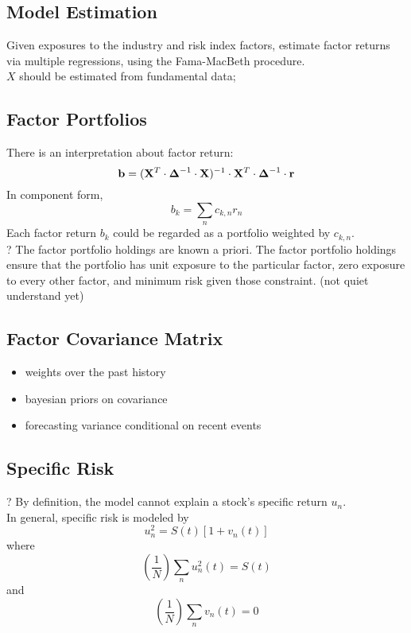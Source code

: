 \documentclass[fontsize=11pt, %
                             paper=a4, %
                             twoside, %
                             captions=tableheading,
                             index=totoc,
                             hyperref]{labbook}
\begin{document}
\begin{addmargin}[4cm]{0cm}
\section{Model Estimation}
Given exposures to the industry and risk index factors, estimate factor returns via multiple regressions, using the Fama-MacBeth procedure.\\
$X$ should be estimated from fundamental data;
\subsection{Factor Portfolios}
There is an interpretation about factor return:
\begin{equation}
\mathbf{b}=(\mathbf{X}^T \cdot \mbox{\boldmath$ \Delta $}^{-1}\cdot \mathbf{X})^{-1}\cdot \mathbf{X}^T\cdot \mbox{\boldmath$ \Delta $}^{-1}\cdot \mathbf{r}
\end{equation}
In component form,
\begin{equation}
b_k=\sum_n c_{k,n}r_n
\end{equation}
Each factor return $b_k$ could be regarded as a portfolio weighted by $c_{k,n}$.\\
? The factor portfolio holdings are known a priori. The factor portfolio holdings ensure that the portfolio has unit exposure to the particular factor, zero exposure to every other factor, and minimum risk given those constraint. (not quiet understand yet)
\subsection{Factor Covariance Matrix}
\begin{itemize}
\item
weights over the past history
\item
bayesian priors on covariance
\item
forecasting variance conditional on recent events
\end{itemize}
\subsection{Specific Risk}
? By definition, the model cannot explain a stock's specific return $u_n$.\\
In general, specific risk is modeled by
\begin{equation}
u_n^2=S(t)[1+v_n(t)]
\end{equation}
where
\begin{equation}
\left(\frac{1}{N}\right)\sum_n u_n^2(t)=S(t)
\end{equation}
and
\begin{equation}
\left(\frac{1}{N}\right)\sum_n v_n(t)=0
\end{equation}

\end{addmargin}
\end{document}
